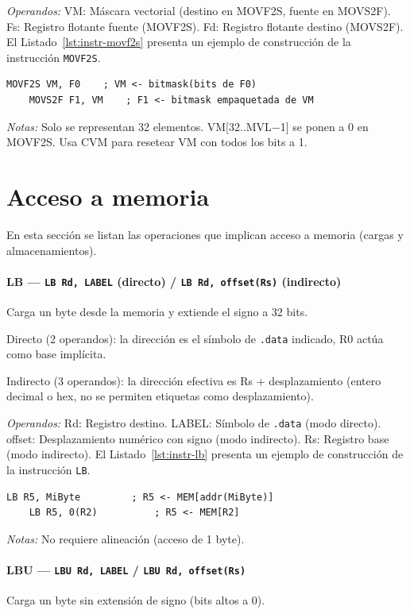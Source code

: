 \documentclass[../main.tex]{subfiles}
\begin{document}
\textit{Operandos:} VM: Máscara vectorial (destino en MOVF2S, fuente en MOVS2F). Fs: Registro flotante fuente (MOVF2S). Fd: Registro flotante destino (MOVS2F).
El Listado~\ref{lst:instr-movf2s} presenta un ejemplo de construcción de la instrucción \texttt{MOVF2S}.

\begin{lstlisting}[caption={MOVF2S},label={lst:instr-movf2s}]
	MOVF2S VM, F0    ; VM <- bitmask(bits de F0)
	MOVS2F F1, VM    ; F1 <- bitmask empaquetada de VM
\end{lstlisting}
\textit{Notas:} Solo se representan 32 elementos. VM[32..MVL$-$1] se ponen a 0 en MOVF2S. Usa CVM para resetear VM con todos los bits a 1.

\section{Acceso a memoria}

En esta sección se listan las operaciones que implican acceso a memoria (cargas y almacenamientos).

\paragraph*{LB --- \texttt{LB Rd, LABEL} (directo) / \texttt{LB Rd, offset(Rs)} (indirecto)}
Carga un byte desde la memoria y extiende el signo a 32 bits.

Directo (2 operandos): la dirección es el símbolo de \texttt{.data} indicado, R0 actúa como base implícita.

Indirecto (3 operandos): la dirección efectiva es Rs + desplazamiento (entero decimal o hex, no se permiten etiquetas como desplazamiento).

\textit{Operandos:} Rd: Registro destino. LABEL: Símbolo de \texttt{.data} (modo directo). offset: Desplazamiento numérico con signo (modo indirecto). Rs: Registro base (modo indirecto).
El Listado~\ref{lst:instr-lb} presenta un ejemplo de construcción de la instrucción \texttt{LB}.

\begin{lstlisting}[caption={LB},label={lst:instr-lb}]
	LB R5, MiByte         ; R5 <- MEM[addr(MiByte)]
	LB R5, 0(R2)          ; R5 <- MEM[R2]
\end{lstlisting}
\textit{Notas:} No requiere alineación (acceso de 1 byte).

\paragraph*{LBU --- \texttt{LBU Rd, LABEL} / \texttt{LBU Rd, offset(Rs)}}
Carga un byte sin extensión de signo (bits altos a 0).
\end{document}
